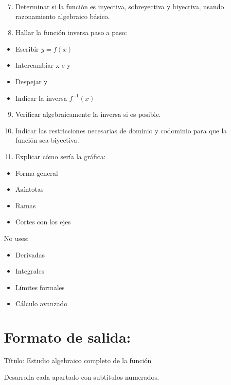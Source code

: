 \documentclass[12pt,a4paper]{article}
\begin{document}
	\begin{enumerate}
		\setcounter{enumi}{6}
		\item Determinar si la función es inyectiva, sobreyectiva y biyectiva, usando razonamiento algebraico básico.
		\item Hallar la función inversa paso a paso:
	\end{enumerate}
	
	\begin{itemize}
		\item Escribir $y=f(x)$
		\item Intercambiar x e y
		\item Despejar y
		\item Indicar la inversa $f^{-1}(x)$
	\end{itemize}
	
	\begin{enumerate}
		\setcounter{enumi}{8}
		\item Verificar algebraicamente la inversa si es posible.
		\item Indicar las restricciones necesarias de dominio y codominio para que la función sea biyectiva.
		\item Explicar cómo sería la gráfica:
	\end{enumerate}
	
	\begin{itemize}
		\item Forma general
		\item Asíntotas
		\item Ramas
		\item Cortes con los ejes
	\end{itemize}
	
	No uses:
	
	\begin{itemize}
		\item Derivadas
		\item Integrales
		\item Límites formales
		\item Cálculo avanzado
	\end{itemize}
	
	\section*{Formato de salida:}
	
	Título: Estudio algebraico completo de la función
	
	Desarrolla cada apartado con subtítulos numerados.
	
\end{document}
